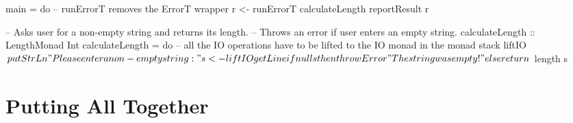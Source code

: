 \begin{hcode}
main = do
  -- runErrorT removes the ErrorT wrapper
  r <- runErrorT calculateLength
  reportResult r

-- Asks user for a non-empty string and returns its length.
-- Throws an error if user enters an empty string.
calculateLength :: LengthMonad Int
calculateLength = do
  -- all the IO operations have to be lifted to the IO monad in the monad stack
  liftIO $ putStrLn "Please enter a non-empty string: "
  s <- liftIO getLine
  if null s
    then throwError "The string was empty!"
    else return $ length s
\end{hcode}



\section{Putting All Together}